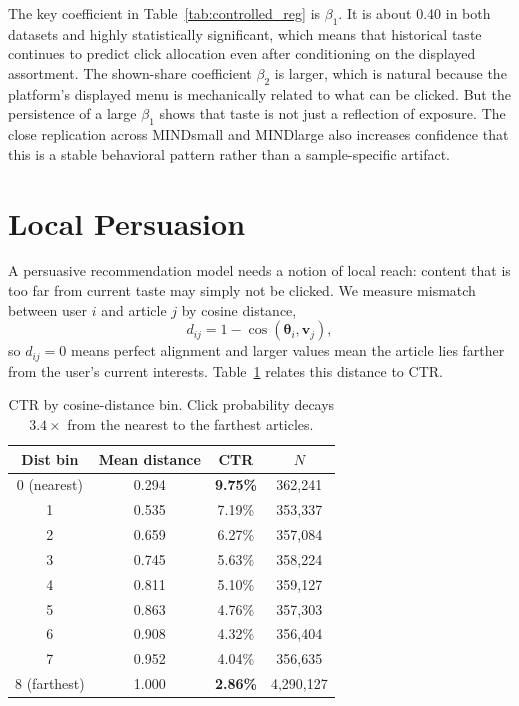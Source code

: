 \documentclass[11pt]{article}
\begin{document}
The key coefficient in Table~\ref{tab:controlled_reg} is $\beta_1$. It is about 0.40 in both datasets and highly statistically significant, which means that historical taste continues to predict click allocation even after conditioning on the displayed assortment. The shown-share coefficient $\beta_2$ is larger, which is natural because the platform's displayed menu is mechanically related to what can be clicked. But the persistence of a large $\beta_1$ shows that taste is not just a reflection of exposure. The close replication across MINDsmall and MINDlarge also increases confidence that this is a stable behavioral pattern rather than a sample-specific artifact.

\section{Local Persuasion}
\label{sec:persuasion}

A persuasive recommendation model needs a notion of local reach: content that is too far from current taste may simply not be clicked. We measure mismatch between user $i$ and article $j$ by cosine distance,
\[
d_{ij} = 1 - \cos(\boldsymbol{\theta}_i,\mathbf{v}_j),
\]
so $d_{ij}=0$ means perfect alignment and larger values mean the article lies farther from the user's current interests. Table~\ref{tab:persuasion_radius} relates this distance to CTR.

\begin{table}[ht]
\centering
\caption{CTR by cosine-distance bin. Click probability decays $3.4\times$ from the nearest to the farthest articles.}
\label{tab:persuasion_radius}
\begin{tabular}{cccc}
\toprule
Dist bin & Mean distance & CTR & $N$ \\
\midrule
0 (nearest) & 0.294 & \textbf{9.75\%} & 362,241 \\
1 & 0.535 & 7.19\% & 353,337 \\
2 & 0.659 & 6.27\% & 357,084 \\
3 & 0.745 & 5.63\% & 358,224 \\
4 & 0.811 & 5.10\% & 359,127 \\
5 & 0.863 & 4.76\% & 357,303 \\
6 & 0.908 & 4.32\% & 356,404 \\
7 & 0.952 & 4.04\% & 356,635 \\
8 (farthest) & 1.000 & \textbf{2.86\%} & 4,290,127 \\
\bottomrule
\end{tabular}
\end{table}
\FloatBarrier
\end{document}
